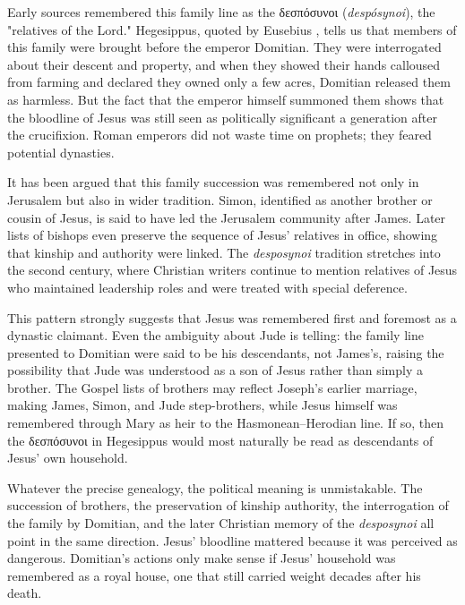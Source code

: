 Early sources remembered this family line as the δεσπόσυνοι (\textit{despósynoi}), the "relatives of the Lord."
Hegesippus, quoted by Eusebius \cite[3.19--20]{eusebius:he}, tells us that members of this family were brought before the emperor Domitian.
They were interrogated about their descent and property, and when they showed their hands calloused from farming and declared they owned only a few acres, Domitian released them as harmless.
But the fact that the emperor himself summoned them shows that the bloodline of Jesus was still seen as politically significant a generation after the crucifixion.
Roman emperors did not waste time on prophets; they feared potential dynasties.

It has been argued that this family succession was remembered not only in Jerusalem but also in wider tradition.
Simon, identified as another brother or cousin of Jesus, is said to have led the Jerusalem community after James.
Later lists of bishops even preserve the sequence of Jesus’ relatives in office, showing that kinship and authority were linked.
The \emph{desposynoi} tradition stretches into the second century, where Christian writers continue to mention relatives of Jesus who maintained leadership roles and were treated with special deference.

This pattern strongly suggests that Jesus was remembered first and foremost as a dynastic claimant.
Even the ambiguity about Jude is telling: the family line presented to Domitian were said to be his descendants, not James’s, raising the possibility that Jude was understood as a son of Jesus rather than simply a brother.
The Gospel lists of brothers may reflect Joseph’s earlier marriage, making James, Simon, and Jude step-brothers, while Jesus himself was remembered through Mary as heir to the Hasmonean--Herodian line.
If so, then the δεσπόσυνοι in Hegesippus would most naturally be read as descendants of Jesus’ own household.

Whatever the precise genealogy, the political meaning is unmistakable.
The succession of brothers, the preservation of kinship authority, the interrogation of the family by Domitian, and the later Christian memory of the \emph{desposynoi} all point in the same direction.
Jesus’ bloodline mattered because it was perceived as dangerous.
Domitian’s actions only make sense if Jesus’ household was remembered as a royal house, one that still carried weight decades after his death.

